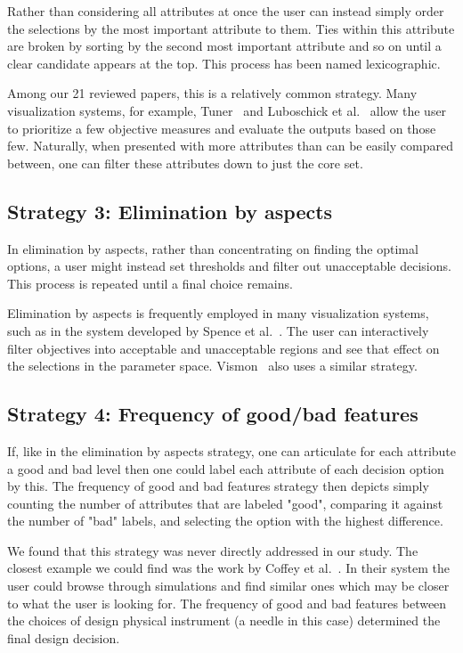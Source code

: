 Rather than considering all attributes at once the user can instead simply
order the selections by the most important attribute to them. Ties within this
attribute are broken by sorting by the second most important attribute and so
on until a clear candidate appears at the top. This process has been named
lexicographic.

Among our 21 reviewed papers, this is a relatively common strategy.
Many visualization systems, for example, Tuner~\cite{Torsney-Weir:2011} and
Luboschick et al.~\citep{Luboschik:2014} allow the user to prioritize a few
objective measures and evaluate the outputs based on those few. Naturally,
when presented with more attributes than can be easily compared between,
one can filter
these attributes down to just the core set. 

\subsection{Strategy 3: Elimination by aspects}\label{elimination-by-aspects}

In elimination by aspects,
rather than concentrating on finding the optimal options, a user might
instead set thresholds and filter out unacceptable decisions. This process
is repeated until a final choice remains.

Elimination by aspects is frequently employed in many visualization systems, 
such as in the system developed by Spence et al.~\citep{Spence:1995}. The user can interactively filter
objectives into acceptable and unacceptable regions and
see that effect on the selections in the parameter space. 
Vismon~\citep{Booshehrian:2012} also uses a similar strategy.

\subsection{Strategy 4: Frequency of good/bad features}
\label{frequency-of-goodbad-features}

If, like in the elimination by aspects strategy, one can articulate for
each attribute a good and bad level then one could label each attribute
of each decision option by this. The frequency of good and bad features strategy 
then depicts simply counting the number of
attributes that are labeled "good",  comparing it against the number of
"bad" labels, and selecting the option with the highest difference. 

We found that this strategy was never directly addressed in our study.
The closest example we could find was the work by 
Coffey et al.~\citep{Coffey:2013}. In their system the user could browse
through simulations and find similar ones which may be closer to what
the user is looking for. The frequency of good and bad features between the
choices of design physical instrument (a needle in this case) determined the final design decision.

